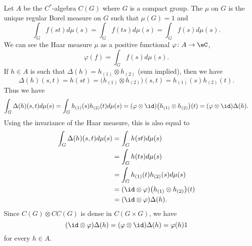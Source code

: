 Let $A$ be the $C^*$-algebra $C(G)$ where $G$ is a compact group. The  $\mu$ on $G$ is the unique regular Borel measure on $G$ such that $\mu(G)=1$ and
\begin{equation}
    \int_G f(st)d\mu(s)=\int_G f(ts)d\mu(s)=\int_Gf(s)d\mu(s).
\end{equation}
We can see the Haar measure $\mu$ as a positive functional $\varphi\colon A\to \eC$,
\begin{equation}
    \varphi(f)=\int_G f(s)d\mu(s).
\end{equation}
If $h\in A$ is such that $\Delta(h)=h_{(1)}\otimes h_{(2)}$ (sum implied), then we have
\begin{equation}
    \Delta(h)(s,t)=h(st)=\big( h_{(1)}\otimes h_{(2)} \big)(s,t)=h_{(1)}(s)h_{(2)}(t).
\end{equation}
Thus we have
\begin{equation}
    \int_G\Delta(h)(s,t)d\mu(s)=\int_Gh_{(1)}(s)h_{(2)}(t)d\mu(s)=(\varphi\otimes\id)\big( h_{(1)}\otimes h_{(2)} \big)(t)=(\varphi\otimes\id)\Delta(h).
\end{equation}
Using the invariance of the Haar measure, this is also equal to
\begin{equation}
    \begin{aligned}[]
        \int_G\Delta(h)(s,t)d\mu(s)&=\int_Gh(st)d\mu(s)\\
        &=\int_Gh(ts)d\mu(s)\\
        &=\int_Gh_{(1)}(t)h_{(2)}(s)d\mu(s)\\
        &=(\id\otimes\varphi)\big( h_{(1)}\otimes h_{(2)} \big)(t)\\
        &=(\id\otimes\varphi)\Delta(h).
    \end{aligned}
\end{equation}
Since $C(G)\otimes CC(G)$ is dense in $C(G\times G)$, we have
\begin{equation}
    (\id\otimes\varphi)\Delta(h)=(\varphi\otimes\id)\Delta(h)=\varphi(h)1
\end{equation}
for every $h\in A$.


